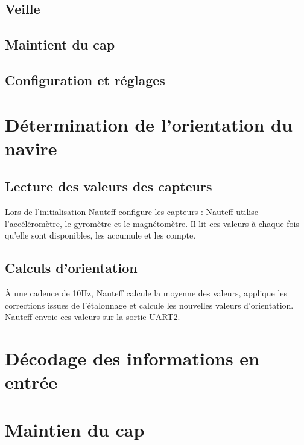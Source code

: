 \documentclass[a4paper,11pt]{report}
\begin{document}
\subsection{Veille}

\subsection{Maintient du cap}

\subsection{Configuration et réglages}

\section{Détermination de l'orientation du navire}
\subsection{Lecture des valeurs des capteurs}
Lors de l'initialisation Nauteff configure les capteurs :
Nauteff utilise l'accéléromètre, le gyromètre et le magnétomètre.
Il lit ces valeurs à chaque fois qu'elle sont disponibles,
les accumule et les compte.

\subsection{Calculs d'orientation}
À une cadence de 10Hz, Nauteff calcule la moyenne des valeurs,
applique les corrections issues de l'étalonnage et
calcule les nouvelles valeurs d'orientation.
Nauteff envoie ces valeurs sur la sortie UART2.


\section{Décodage des informations en entrée}

\section{Maintien du cap}
\end{document}
